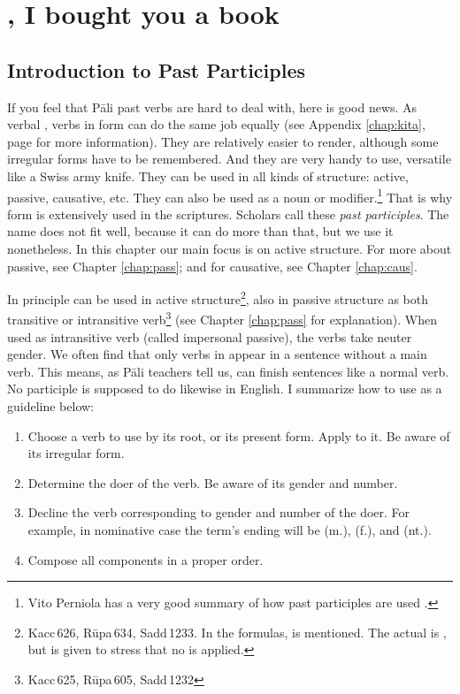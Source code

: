 \chapter{, I bought you a book}\label{chap:pp}

{}
\section*{Introduction to Past Participles}

If you feel that P\=ali past verbs are hard to deal with, here is good news. As verbal , verbs in  form can do the same job equally (see Appendix \ref{chap:kita}, page \pageref{pacck8:ta} for more information). They are relatively easier to render, although some irregular forms have to be remembered. And they are very handy to use, versatile like a Swiss army knife. They can be used in all kinds of structure: active, passive, causative, etc. They can also be used as a noun or modifier.\footnote{Vito Perniola has a very good summary of how past participles are used \citep[see][pp.~360--7]{perniola:grammar}.} That is why  form is extensively used in the scriptures. Scholars call these \emph{past participles}. The name does not fit well, because it can do more than that, but we use it nonetheless. In this chapter our main focus is on active structure. For more about passive, see Chapter \ref{chap:pass}; and for causative, see Chapter \ref{chap:caus}.

In principle  can be used in active structure\footnote{Kacc\,626, R\=upa\,634, Sadd\,1233. In the formulas,  is mentioned. The actual  is , but  is given to stress that no  is applied.}, also in passive structure as both transitive or intransitive verb\footnote{Kacc\,625, R\=upa\,605, Sadd\,1232} (see Chapter \ref{chap:pass} for explanation). When used as intransitive verb (called impersonal passive), the verbs take neuter gender. We often find that only verbs in  appear in a sentence without a main verb. This means, as P\=ali teachers tell us,  can finish sentences like a normal verb. No participle is supposed to do likewise in English. I summarize how to use  as a guideline below:

\begin{enumerate}
\item Choose a verb to use by its root, or its present form. Apply  to it. Be aware of its irregular form.
\item Determine the doer of the verb. Be aware of its gender and number.
\item Decline the  verb corresponding to gender and number of the doer. For example, in nominative case the term's ending will be  (m.),  (f.), and  (nt.). 
\item Compose all components in a proper order.
\end{enumerate}

